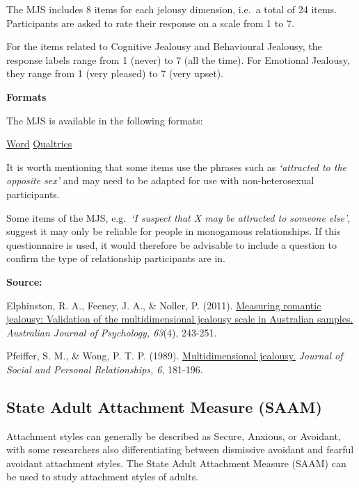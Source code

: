 \documentclass[
]{book}
\begin{document}
The MJS includes 8 items for each jelousy dimension, i.e.~a total of 24 items. Participants are asked to rate their response on a scale from 1 to 7.

For the items related to Cognitive Jealousy and Behavioural Jealousy, the response labels range from 1 (never) to 7 (all the time). For Emotional Jealousy, they range from 1 (very pleased) to 7 (very upset).

\textbf{Formats}

The MJS is available in the following formats:

\href{questionnaires/Multi-dimensionalJealousyScale.docx}{Word} \textbar{} \href{questionnaires/Multi-dimensionalJealousyScale.qsf}{Qualtrics}

It is worth mentioning that some items use the phrases such as \emph{`attracted to the opposite sex'} and may need to be adapted for use with non-heterosexual participants.

Some items of the MJS, e.g.~\emph{`I suspect that X may be attracted to someone else'}, suggest it may only be reliable for people in monogamous relationships. If this questionnaire is used, it would therefore be advisable to include a question to confirm the type of relationship participants are in.

\textbf{Source:}

Elphinston, R. A., Feeney, J. A., \& Noller, P. (2011). \href{https://aps.onlinelibrary.wiley.com/doi/abs/10.1111/j.1742-9536.2011.00026.x}{Measuring romantic jealousy: Validation of the multidimensional jealousy scale in Australian samples.} \emph{Australian Journal of Psychology, 63}(4), 243-251.

Pfeiffer, S. M., \& Wong, P. T. P. (1989). \href{http://www.drpaulwong.com/wp-content/uploads/2018/03/Multidimensional-Jealousy-Scale-Pfeiffer-Wong-1989-Paper.pdf}{Multidimensional jealousy.} \emph{Journal of Social and Personal Relationships, 6}, 181-196.

\hypertarget{state-adult-attachment-measure-saam}{%
\subsection{State Adult Attachment Measure (SAAM)}\label{state-adult-attachment-measure-saam}}

Attachment styles can generally be described as Secure, Anxious, or Avoidant, with some researchers also differentiating between dismissive avoidant and fearful avoidant attachment styles. The State Adult Attachment Measure (SAAM) can be used to study attachment styles of adults.
\end{document}
